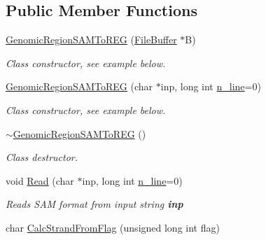 \subsection*{Public Member Functions}
\begin{DoxyCompactItemize}
\item 
\hypertarget{classGenomicRegionSAMToREG_a67555a42a7bba86d7e0389a09d1e3407}{
\hyperlink{classGenomicRegionSAMToREG_a67555a42a7bba86d7e0389a09d1e3407}{GenomicRegionSAMToREG} (\hyperlink{classFileBuffer}{FileBuffer} $\ast$B)}
\label{classGenomicRegionSAMToREG_a67555a42a7bba86d7e0389a09d1e3407}

\begin{DoxyCompactList}\small\item\em Class constructor, see example below. \end{DoxyCompactList}\item 
\hypertarget{classGenomicRegionSAMToREG_ad29083be26f4117ba4af3f265716b9ad}{
\hyperlink{classGenomicRegionSAMToREG_ad29083be26f4117ba4af3f265716b9ad}{GenomicRegionSAMToREG} (char $\ast$inp, long int \hyperlink{classGenomicRegion_aefe2255aeed5338060190ded05cb9c0c}{n\_\-line}=0)}
\label{classGenomicRegionSAMToREG_ad29083be26f4117ba4af3f265716b9ad}

\begin{DoxyCompactList}\small\item\em Class constructor, see example below. \end{DoxyCompactList}\item 
\hypertarget{classGenomicRegionSAMToREG_a19dea1653efdc013f4425a43470eab02}{
\hyperlink{classGenomicRegionSAMToREG_a19dea1653efdc013f4425a43470eab02}{$\sim$GenomicRegionSAMToREG} ()}
\label{classGenomicRegionSAMToREG_a19dea1653efdc013f4425a43470eab02}

\begin{DoxyCompactList}\small\item\em Class destructor. \end{DoxyCompactList}\item 
\hypertarget{classGenomicRegionSAMToREG_ab4a3b874cafac1537a7d7287cae39e76}{
void \hyperlink{classGenomicRegionSAMToREG_ab4a3b874cafac1537a7d7287cae39e76}{Read} (char $\ast$inp, long int \hyperlink{classGenomicRegion_aefe2255aeed5338060190ded05cb9c0c}{n\_\-line}=0)}
\label{classGenomicRegionSAMToREG_ab4a3b874cafac1537a7d7287cae39e76}

\begin{DoxyCompactList}\small\item\em Reads SAM format from input string {\bfseries inp} \end{DoxyCompactList}\item 
\hypertarget{classGenomicRegionSAMToREG_acc2044e03dc7e75bdcada1eb1e77a5ea}{
char \hyperlink{classGenomicRegionSAMToREG_acc2044e03dc7e75bdcada1eb1e77a5ea}{CalcStrandFromFlag} (unsigned long int flag)}
\label{classGenomicRegionSAMToREG_acc2044e03dc7e75bdcada1eb1e77a5ea}


\end{DoxyCompactItemize}
